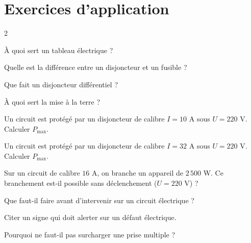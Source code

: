 \section{Exercices d'application}
\begin{multicols}{2}

\exo{} À quoi sert un tableau électrique ?

\exo{} Quelle est la différence entre un disjoncteur et un fusible ?

\exo{} Que fait un disjoncteur différentiel ?

\exo{} À quoi sert la mise à la terre ?

\exo{} Un circuit est protégé par un disjoncteur de calibre $I=10$ A sous
$U=220$ V. Calculer $P_{\max}$.

\exo{} Un circuit est protégé par un disjoncteur de calibre $I=32$ A sous
$U=220$ V. Calculer $P_{\max}$.

\exo{} Sur un circuit de calibre $16$ A, on branche un appareil de $2\,500$ W.
Ce branchement est-il possible sans déclenchement ($U=220$ V) ?

\exo{} Que faut-il faire avant d'intervenir sur un circuit électrique ?

\exo{} Citer un signe qui doit alerter sur un défaut électrique.

\exo{} Pourquoi ne faut-il pas surcharger une prise multiple ?

\end{multicols}

